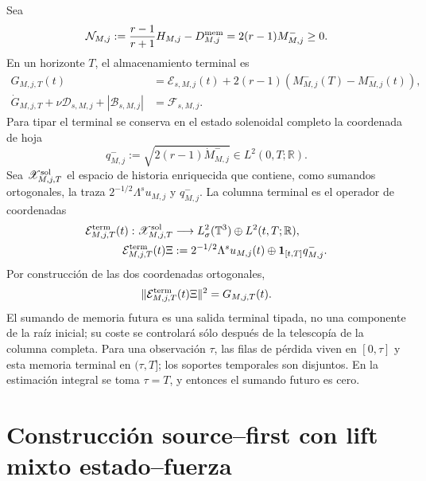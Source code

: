 Sea
\[
 \mathcal N_{M,j}:=
 \frac{r-1}{r+1}H_{M,j}-D_{M,j}^{\rm mem}
 =2(r-1)M_{M,j}^-\ge0.
\]
En un horizonte $T$, el almacenamiento terminal es
\begin{equation}\label{eq:pdf2-ns-storage}
 \begin{aligned}
 G_{M,j,T}(t)
 &=\mathscr E_{s,M,j}(t)+2(r-1)(M^-_{M,j}(T)-M^-_{M,j}(t)),\\
 \dot G_{M,j,T}+\nu\mathscr D_{s,M,j}+|\mathscr B_{s,M,j}|
 &=\mathscr F_{s,M,j}.
 \end{aligned}
\end{equation}
Para tipar el terminal se conserva en el estado solenoidal completo la coordenada
de hoja
\[
 q^-_{M,j}:=\sqrt{2(r-1)\dot M^-_{M,j}}
 \in L^2(0,T;\mathbb R).
\]
Sea $\mathscr X^{\rm sol}_{M,j,T}$ el espacio de historia enriquecida que contiene,
como sumandos ortogonales, la traza $2^{-1/2}\Lambda^su_{M,j}$ y $q^-_{M,j}$.
La columna terminal es el operador de coordenadas
\begin{equation}\label{eq:pdf2-ns-terminal-column}
 \begin{aligned}
 \mathcal E_{M,j,T}^{\rm term}(t):\mathscr X^{\rm sol}_{M,j,T}
 &\longrightarrow L^2_\sigma(\mathbb T^3)
   \oplus L^2(t,T;\mathbb R),\\
 \mathcal E_{M,j,T}^{\rm term}(t)\Xi
 &:=2^{-1/2}\Lambda^su_{M,j}(t)
 \oplus\mathbf1_{[t,T]}q^-_{M,j}.
 \end{aligned}
\end{equation}
Por construcción de las dos coordenadas ortogonales,
\begin{equation}\label{eq:pdf2-ns-terminal-column-gram}
 \|\mathcal E_{M,j,T}^{\rm term}(t)\Xi\|^2
 =G_{M,j,T}(t).
\end{equation}
El sumando de memoria futura es una salida terminal tipada, no una componente de la
raíz inicial; su coste se controlará sólo después de la telescopía de la columna
completa. Para una observación $\tau$, las filas de pérdida viven en
$[0,\tau]$ y esta memoria terminal en $(\tau,T]$; los soportes temporales son
disjuntos. En la estimación integral se toma $\tau=T$, y entonces el sumando
futuro es cero.

\section{Construcción source--first con lift mixto estado--fuerza}

